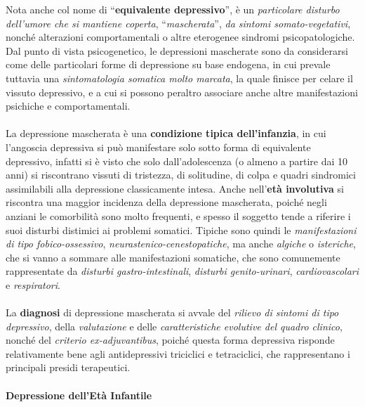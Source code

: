 Nota anche col nome di ``\textbf{equivalente depressivo}'', è un
\emph{particolare disturbo dell'umore che si mantiene coperta},
``\emph{mascherata}'', \emph{da sintomi somato-vegetativi}, nonché
alterazioni comportamentali o altre eterogenee sindromi
psicopatologiche. Dal punto di vista psicogenetico, le depressioni
mascherate sono da considerarsi come delle particolari forme di
depressione su base endogena, in cui prevale tuttavia una
\emph{sintomatologia somatica molto marcata}, la quale finisce per
celare il vissuto depressivo, e a cui si possono peraltro associare
anche altre manifestazioni psichiche e comportamentali.
\\\\
La depressione mascherata è una \textbf{condizione tipica
dell'infanzia}, in cui l'angoscia depressiva si può manifestare solo
sotto forma di equivalente depressivo, infatti si è visto che solo
dall'adolescenza (o almeno a partire dai 10 anni) si riscontrano vissuti
di tristezza, di solitudine, di colpa e quadri sindromici assimilabili
alla depressione classicamente intesa. Anche nell'\textbf{età
involutiva} si riscontra una maggior incidenza della depressione
mascherata, poiché negli anziani le comorbilità sono molto frequenti, e
spesso il soggetto tende a riferire i suoi disturbi distimici ai
problemi somatici. Tipiche sono quindi le \emph{manifestazioni di tipo
fobico-ossessivo}, \emph{neurastenico-cenestopatiche}, ma anche
\emph{algiche} o \emph{isteriche}, che si vanno a sommare alle
manifestazioni somatiche, che sono comunemente rappresentate da
\emph{disturbi gastro-intestinali}, \emph{disturbi genito-urinari},
\emph{cardiovascolari} e \emph{respiratori}.
\\\\
La \textbf{diagnosi} di depressione mascherata si avvale del
\emph{rilievo di sintomi di tipo depressivo}, della \emph{valutazione} e
delle \emph{caratteristiche evolutive del quadro clinico}, nonché del
\emph{criterio ex-adjuvantibus}, poiché questa forma depressiva risponde
relativamente bene agli antidepressivi triciclici e tetraciclici, che
rappresentano i principali presidi terapeutici.

\paragraph{Depressione dell'Età Infantile}

